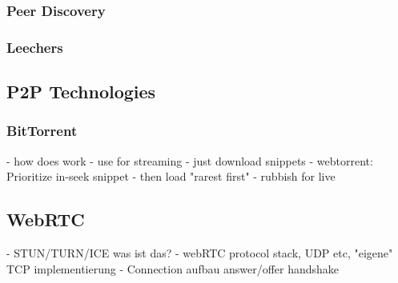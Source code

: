 \subsubsection{Peer Discovery}

\subsubsection{Leechers}

\subsection{P2P Technologies}
\subsubsection{BitTorrent}
- how does work
- use for streaming
    - just download snippets
    - webtorrent: Prioritize in-seek snippet
        - then load "rarest first"
    - rubbish for live

 \citet[V B.]{coolstreaming-design-theory}

\subsection{WebRTC}\label{webrtc}
- STUN/TURN/ICE was ist das?
- webRTC protocol stack, UDP etc, "eigene" TCP implementierung
- Connection aufbau answer/offer handshake
